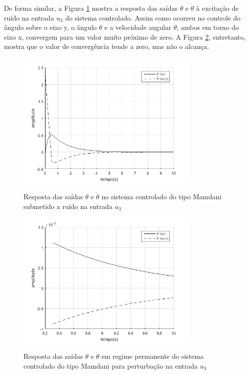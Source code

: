 De forma similar, a Figura \ref{fig:u3_mamdani_u3_theta} mostra a resposta das saídas $\theta$ e $\dot{\theta}$ à excitação de ruído na entrada $u_3$ do sistema controlado. Assim como ocorreu no controle do ângulo sobre o eixo y, o ângulo $\theta$ e a velocidade angular $\dot{\theta}$, ambos em torno do eixo x, convergem para um valor muito próximo de zero. A Figura \ref{fig:u3_mamdani_u3_theta_regime_permanente}, entretanto, mostra que o valor de convergência tende a zero, mas não o alcança.

\begin{figure}[!htb]
    \centering
    \caption{Resposta das saídas $\theta$ e $\dot{\theta}$ no sistema controlado do tipo Mamdani submetido a ruído na entrada $u_3$}
    \includegraphics[width=0.8\textwidth]{./04-figuras/resultados/fis_u3/u3_mamdani_u3_theta}
    \label{fig:u3_mamdani_u3_theta}
\end{figure}

\begin{figure}[!htb]
    \centering
    \caption{Resposta das saídas $\theta$ e $\dot{\theta}$ em regime permanente do sistema controlado do tipo Mamdani para perturbação na entrada $u_3$}
    \includegraphics[width=0.8\textwidth]{./04-figuras/resultados/fis_u3/u3_mamdani_u3_theta_regime_permanente}
    \label{fig:u3_mamdani_u3_theta_regime_permanente}
\end{figure}

